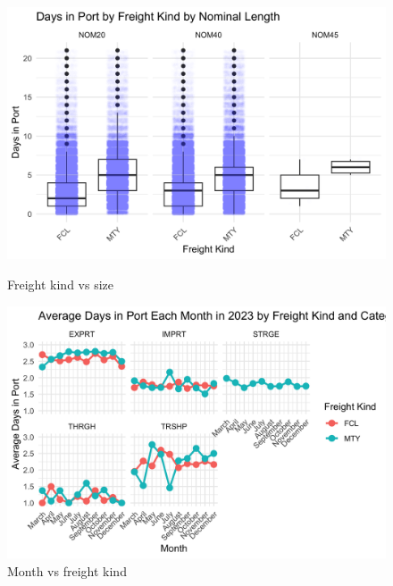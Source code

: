 			\begin{figure}[ht]
				\centering
				\begin{minipage}{0.5\textwidth}
					\centering
					\includegraphics[width=\textwidth]{images/du_three}
					\caption{Freight kind vs size}
					\label{fig:freigh_kind_and_nominal_length}
				\end{minipage}%
				\hfill
				\begin{minipage}{0.5\textwidth}
					\centering
					\includegraphics[width=\textwidth]{images/du_two}
					\caption{Month vs freight kind}
					\label{fig:category_freiht_kind_and_month}
				\end{minipage}
			\end{figure}

